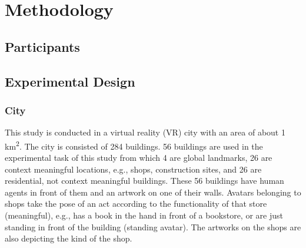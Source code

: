 \chapter{Methodology}

\section{Participants}


\section{Experimental Design}


\subsection{City}

This study is conducted in a virtual reality (VR) city with an area of about 1 km\textsuperscript2. The city is consisted of 284 buildings. 56 buildings are used in the experimental task of this study from which 4 are global landmarks, 26 are {\emphasize context meaningful} locations, e.g., shops, construction sites, and 26 are residential, {\emphasize not context meaningful} buildings. These 56 buildings have human agents in front of them and an artwork on one of their walls. Avatars belonging to shops take the pose of an act according to the functionality of that store {\emphasize(meaningful)}, e.g., has a book in the hand in front of a bookstore, or are just standing in front of the building {\emphasize(standing avatar)}. The artworks on the shops are also depicting the kind of the shop.

